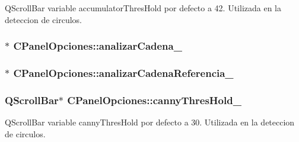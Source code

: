 Q\+Scroll\+Bar variable accumulator\+Thres\+Hold por defecto a 42. Utilizada en la deteccion de circulos. 

\subsubsection[{\texorpdfstring{analizar\+Cadena\+\_\+}{analizarCadena_}}]{$\ast$ C\+Panel\+Opciones\+::analizar\+Cadena\+\_\+\hspace{0.3cm}{\ttfamily [private]}}\hypertarget{classCPanelOpciones_ac8aee5d56aa7873f4a2df2700d57769f}{}\label{classCPanelOpciones_ac8aee5d56aa7873f4a2df2700d57769f}
\subsubsection[{\texorpdfstring{analizar\+Cadena\+Referencia\+\_\+}{analizarCadenaReferencia_}}]{$\ast$ C\+Panel\+Opciones\+::analizar\+Cadena\+Referencia\+\_\+\hspace{0.3cm}{\ttfamily [private]}}\hypertarget{classCPanelOpciones_aeb02ff08b9db9f47d5b1efa6a7782518}{}\label{classCPanelOpciones_aeb02ff08b9db9f47d5b1efa6a7782518}
\subsubsection[{\texorpdfstring{canny\+Thres\+Hold\+\_\+}{cannyThresHold_}}]{\setlength{\rightskip}{0pt plus 5cm}Q\+Scroll\+Bar$\ast$ C\+Panel\+Opciones\+::canny\+Thres\+Hold\+\_\+\hspace{0.3cm}{\ttfamily [private]}}\hypertarget{classCPanelOpciones_a02b5fec0793280de210c64541fc47155}{}\label{classCPanelOpciones_a02b5fec0793280de210c64541fc47155}


Q\+Scroll\+Bar variable canny\+Thres\+Hold por defecto a 30. Utilizada en la deteccion de circulos. 

